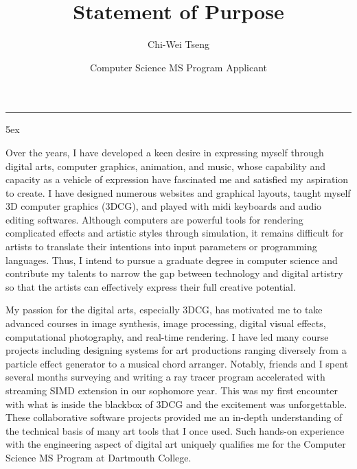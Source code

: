 \documentclass[a4paper, 11pt]{article}
\title{Statement of Purpose}
\author{Chi-Wei Tseng}
\date{Computer Science MS Program Applicant}
\makeatletter
\newcommand{\HRule}{\rule{\linewidth}{0.2mm}}
\renewcommand{\maketitle}{
  \parindent=0pt%
  \begin{flushleft}
  \bf \large{\@author} \hfill {\small \@date}
  \HRule
  \end{flushleft}
  \begin{center}
    \MakeUppercase{\bf \@title}
  \end{center}%
    \par
}
\makeatother
\begin{document}
{\large
{\linespread{0.8} \maketitle}
\parindent 5ex
}

Over the years, I have developed a keen desire in expressing myself through digital arts, computer graphics, animation, and music, whose capability and capacity as a vehicle of expression have fascinated me and satisfied my aspiration to create. I have designed numerous websites and graphical layouts, taught myself 3D computer graphics (3DCG), and played with midi keyboards and audio editing softwares. Although computers are powerful tools for rendering complicated effects and artistic styles through simulation, it remains difficult for artists to translate their intentions into input parameters or programming languages. Thus, I intend to pursue a graduate degree in computer science and contribute my talents to narrow the gap between technology and digital artistry so that the artists can effectively express their full creative potential.


My passion for the digital arts, especially 3DCG, has motivated me to take advanced courses in image synthesis, image processing, digital visual effects, computational photography, and real-time rendering. I have led many course projects including designing systems for art productions ranging diversely from a particle effect generator to a musical chord arranger. Notably, friends and I spent several months surveying and writing a ray tracer program accelerated with streaming SIMD extension in our sophomore year. This was my first encounter with what is inside the blackbox of 3DCG and the excitement was unforgettable. These collaborative software projects provided me an in-depth understanding of the technical basis of many art tools that I once used. Such hands-on experience with the engineering aspect of digital art uniquely qualifies me for the Computer Science MS Program at Dartmouth College.
\end{document}
